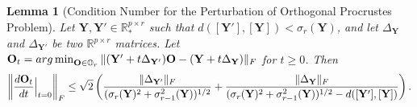 \documentclass[11pt]{article}
\newtheorem{Lemma}{Lemma}
\newcommand{\bbR}{\mathbb{R}}
\newcommand{\0}{{\mathbf{0}}}
\newcommand{\1}{{\mathbf{1}}}
\renewcommand{\O}{{\mathbf{O}}}
\newcommand{\Y}{{\mathbf{Y}}}
\newcommand{\F}{{\rm F}}
\newcommand{\argmin}{\mathop{\rm arg\min}}
\newcommand{\bbO}{\mathbb{O}}
\begin{document}
\begin{Lemma}[Condition Number for the Perturbation of Orthogonal Procrustes Problem] \label{lm: procrustes-condition-number}
	Let $\Y, \Y' \in \bbR^{p \times r}_*$ such that $d([\Y'], [\Y]) < \sigma_r(\Y)$, and let $\Delta_\Y$ and $\Delta_{\Y'}$ be two $\mathbb{R}^{p\times r}$ matrices. Let $\O_t = \argmin_{\O \in \bbO_r} \| (\Y' + t \Delta_{\Y'} ) \O - (\Y + t\Delta_{\Y} )  \|_\F$ for $t \geq 0$. Then
	\begin{equation*}
		\left\| \frac{d \O_t}{dt}\Big|_{t=0}  \right\|_\F \leq \sqrt{2} \left( \frac{\| \Delta_{\Y'} \|_\F }{ ( \sigma_r(\Y)^2 + \sigma^2_{r-1}(\Y) )^{1/2} } + \frac{\| \Delta_{\Y} \|_\F}{( \sigma_r(\Y)^2 + \sigma^2_{r-1}(\Y) )^{1/2} - d([\Y'], [\Y]) }   \right). 
	\end{equation*}
\end{Lemma}
\end{document}
